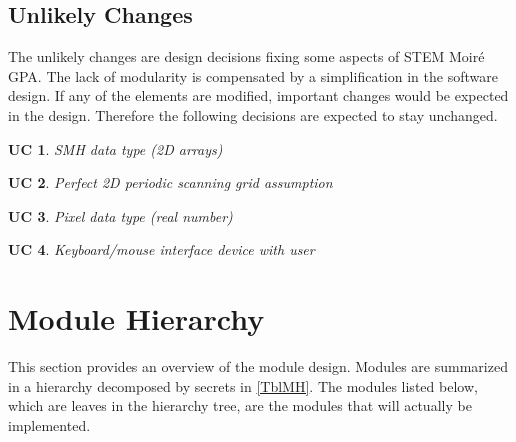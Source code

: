 \documentclass[12pt, titlepage]{article}
\newcommand{\progname}{STEM Moir{\'e} GPA}
\newtheorem{AC}{AC}
\newtheorem{UC}{UC}
\begin{document}

\subsection{Unlikely Changes} \label{SecUchange}

The unlikely changes are design decisions fixing some aspects of \progname{}. 
The lack of modularity is compensated by a simplification in the software 
design. If any of the elements are modified, important changes would be expected 
in the design. Therefore the following decisions are expected to stay unchanged.

\begin{UC}\normalfont SMH data type (2D arrays)
\label{UC_Input_data}
\end{UC}

\begin{UC}\normalfont Perfect 2D periodic scanning grid assumption
\label{UC_Assum_2DPeriodicGrid}
\end{UC}

\begin{UC}\normalfont Pixel data type (real number)
\label{UC_Assum_Pixel}
\end{UC}

\begin{UC}\normalfont Keyboard/mouse interface device with user
\label{UC_Assum_Hardware}
\end{UC}

\section{Module Hierarchy} \label{SecMH}

This section provides an overview of the module design. Modules are summarized
in a hierarchy decomposed by secrets in \cref{TblMH}. The modules listed
below, which are leaves in the hierarchy tree, are the modules that will
actually be implemented.
\end{document}
